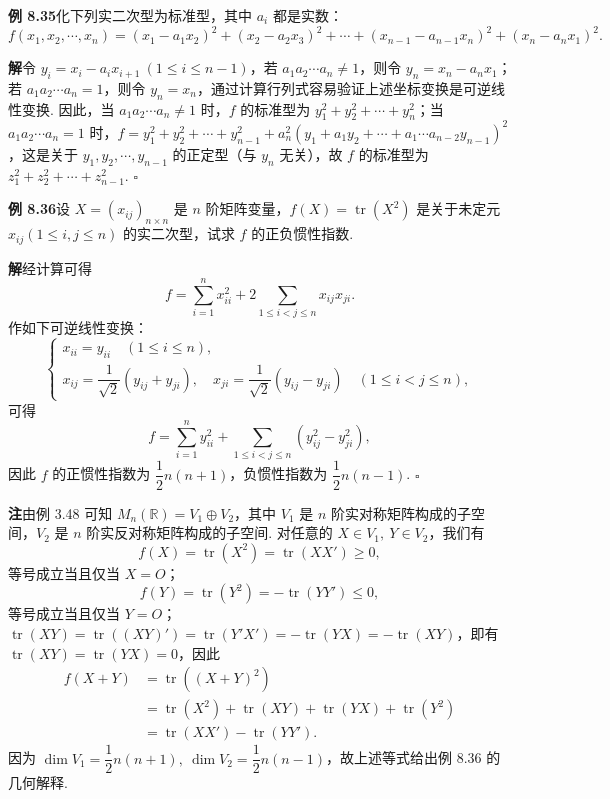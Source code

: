 \documentclass[UTF8,12pt,a4paper,fontset=fandol]{ctexart}
\begin{document}
\noindent\textbf{例 8.35}\quad 化下列实二次型为标准型，其中 $a_i$ 都是实数：
\[
f(x_1,x_2,\cdots,x_n)=(x_1-a_1x_2)^2+(x_2-a_2x_3)^2+\cdots+(x_{n-1}-a_{n-1}x_n)^2+(x_n-a_nx_1)^2.
\]

\noindent\textbf{解}\quad 令 $y_i=x_i-a_ix_{i+1}\ (1\le i\le n-1)$，若 $a_1a_2\cdots a_n\ne 1$，则令 $y_n=x_n-a_nx_1$；若 $a_1a_2\cdots a_n=1$，则令 $y_n=x_n$，通过计算行列式容易验证上述坐标变换是可逆线性变换. 因此，当 $a_1a_2\cdots a_n\ne 1$ 时，$f$ 的标准型为 $y_1^2+y_2^2+\cdots+y_n^2$；当 $a_1a_2\cdots a_n=1$ 时，$f=y_1^2+y_2^2+\cdots+y_{n-1}^2+a_n^2(y_1+a_1y_2+\cdots+a_1\cdots a_{n-2}y_{n-1})^2$，这是关于 $y_1,y_2,\cdots,y_{n-1}$ 的正定型（与 $y_n$ 无关），故 $f$ 的标准型为 $z_1^2+z_2^2+\cdots+z_{n-1}^2$. $\ensuremath{\square}$

\noindent\textbf{例 8.36}\quad 设 $X=(x_{ij})_{n\times n}$ 是 $n$ 阶矩阵变量，$f(X)=\operatorname{tr}(X^2)$ 是关于未定元 $x_{ij}(1\le i,j\le n)$ 的实二次型，试求 $f$ 的正负惯性指数.

\noindent\textbf{解}\quad 经计算可得
\[
f=\sum_{i=1}^n x_{ii}^2+2\sum_{1\le i<j\le n}x_{ij}x_{ji}.
\]
作如下可逆线性变换：
\[
\left\{\begin{array}{l}
x_{ii}=y_{ii}\quad (1\le i\le n),\\
x_{ij}=\dfrac1{\sqrt2}(y_{ij}+y_{ji}),\quad
x_{ji}=\dfrac1{\sqrt2}(y_{ij}-y_{ji})\quad (1\le i<j\le n),
\end{array}\right.
\]
可得
\[
f=\sum_{i=1}^n y_{ii}^2+\sum_{1\le i<j\le n}(y_{ij}^2-y_{ji}^2),
\]
因此 $f$ 的正惯性指数为 $\dfrac12n(n+1)$，负惯性指数为 $\dfrac12n(n-1)$. $\ensuremath{\square}$

\noindent\textbf{注}\quad 由例 3.48 可知 $M_n(\mathbb{R})=V_1\oplus V_2$，其中 $V_1$ 是 $n$ 阶实对称矩阵构成的子空间，$V_2$ 是 $n$ 阶实反对称矩阵构成的子空间. 对任意的 $X\in V_1,\ Y\in V_2$，我们有
\[
f(X)=\operatorname{tr}(X^2)=\operatorname{tr}(XX')\ge 0,
\]
等号成立当且仅当 $X=O$；
\[
f(Y)=\operatorname{tr}(Y^2)=-\operatorname{tr}(YY')\le 0,
\]
等号成立当且仅当 $Y=O$；$\operatorname{tr}(XY)=\operatorname{tr}((XY)')=\operatorname{tr}(Y'X')=-\operatorname{tr}(YX)=-\operatorname{tr}(XY)$，即有 $\operatorname{tr}(XY)=\operatorname{tr}(YX)=0$，因此
\[
\begin{aligned}
f(X+Y)&=\operatorname{tr}((X+Y)^2)\\
&=\operatorname{tr}(X^2)+\operatorname{tr}(XY)+\operatorname{tr}(YX)+\operatorname{tr}(Y^2)\\
&=\operatorname{tr}(XX')-\operatorname{tr}(YY').
\end{aligned}
\]
因为 $\dim V_1=\dfrac12n(n+1),\ \dim V_2=\dfrac12n(n-1)$，故上述等式给出例 8.36 的几何解释.
\end{document}
